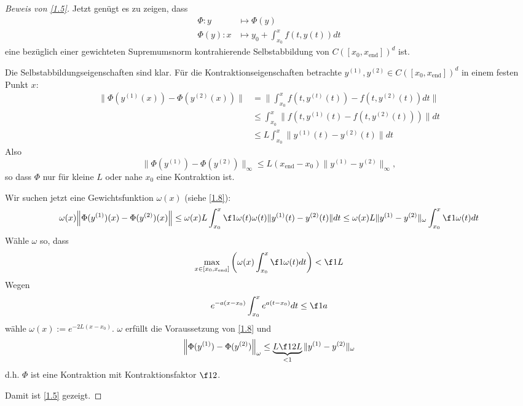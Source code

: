 \documentclass[
]{mycourse}
\begin{document}
\begin{proof}[Beweis von \ref{1.5}]
	Jetzt genügt es zu zeigen, dass
	\begin{align*}
		\Phi: y &\mapsto \Phi(y) \\
		\Phi(y): x &\mapsto y_0 + \int_{x_0}^x f(t,y(t)) dt
	\end{align*}
	eine bezüglich einer gewichteten Supremumsnorm kontrahierende Selbstabbildung von $C([x_0,x_{\text{end}}])^d$ ist.

	Die Selbstabbildungseigenschaften sind klar.
	Für die Kontraktionseigenschaften betrachte $y^{(1)}, y^{(2)} \in C([x_0,x_\text{end}])^d$ in einem festen Punkt $x$:
	\begin{align*}
		\|\Phi(y^{(1)}(x)) - \Phi(y^{(2)}(x))\|
		&= \bigg\| \int_{x_0}^x f(t,y^{(t)}(t)) - f(t,y^{(2)}(t)) dt \bigg\| \\
		&\le \int_{x_0}^x \| f(t, y^{(1)}(t) - f(t, y^{(2)}(t))) \| dt \\
		&\le L \int_{x_0}^x \| y^{(1)}(t) - y^{(2)}(t) \| dt
	\end{align*}
	Also
	\[
		\|\Phi(y^{(1)}) - \Phi(y^{(2)}) \|_\infty \le L(x_{\text{end}}-x_0) \|y^{(1)}  - y^{(2)}\|_\infty,
	\]
	so dass $\Phi$ nur für kleine $L$ oder nahe $x_0$ eine Kontraktion ist.

	Wir suchen jetzt eine Gewichtsfunktion $\omega(x)$ (siehe \ref{1.8}): \fixme[übersichtlicher!]
	\[
		\omega(x) \Big\|\Phi(y^{(1)})(x) - \Phi(y^{(2)})(x) \Big\| 
		\le \omega(x) L \int_{x_0}^x \f 1{\omega(t)} \omega(t) \|y^{(1)}(t) - y^{(2)}(t) \| dt
		\le \omega(x) L\|y^{(1)} - y^{(2)} \|_\omega \int_{x_0}^x \f 1{\omega(t)} dt 
	\]
	Wähle $\omega$ so, dass
	\[
		\max_{x\in [x_0,x_{\text{end}}]} \bigg( \omega(x) \int_{x_0}^x \f 1 {\omega(t)} dt  \bigg)
		< \f 1L
	\]
	Wegen
	\[
		e^{-a(x-x_0)} \int_{x_0}^x e^{a(t-x_0)} dt \le \f 1a
	\]
	wähle $\omega(x) := e^{- 2L (x-x_0)}$.
	$\omega$ erfüllt die Voraussetzung von \ref{1.8} und
	\[
		\Big\|\Phi(y^{(1)}) - \Phi(y^{(2)}) \Big\|_{\omega} \le \underbrace{ L \f 1{2L}}_{< 1} \|y^{(1)} - y^{(2)}\|_\omega
	\]
	d.h. $\Phi$ ist eine Kontraktion mit Kontraktionsfaktor $\f 12$.

	Damit ist \ref{1.5} gezeigt.
\end{proof}
\end{document}
